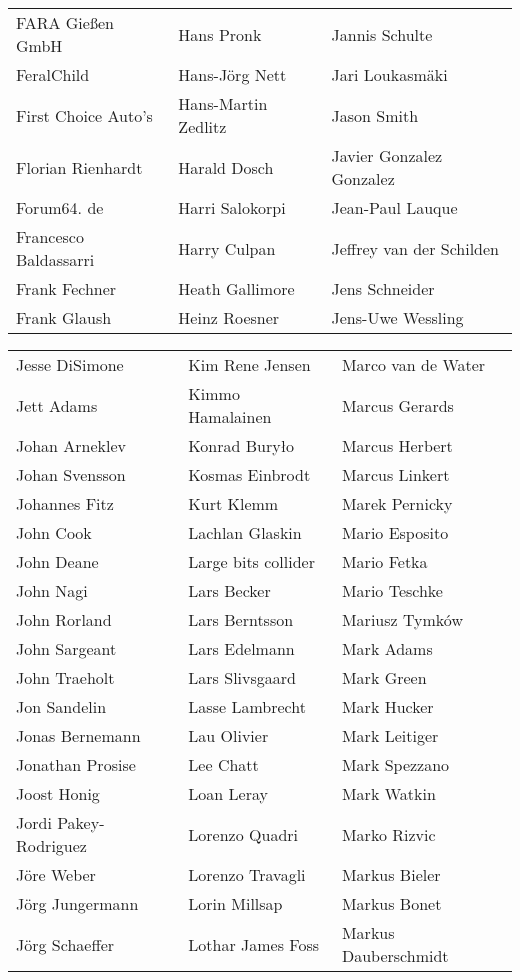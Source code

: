 \begin{small}
\begin{tabular}{p{4cm}p{4cm}p{4cm}}
FARA Gießen GmbH & Hans Pronk & Jannis Schulte \\
FeralChild & Hans-Jörg Nett & Jari Loukasmäki \\
First Choice Auto's & Hans-Martin Zedlitz & Jason Smith \\
Florian Rienhardt & Harald Dosch & Javier Gonzalez Gonzalez \\
Forum64. de & Harri Salokorpi & Jean-Paul Lauque \\
Francesco Baldassarri & Harry Culpan & Jeffrey van der Schilden \\
Frank Fechner & Heath Gallimore & Jens Schneider \\
Frank Glaush & Heinz Roesner & Jens-Uwe Wessling \\
\end{tabular}
\newpage
\setlength{\tabcolsep}{1mm}
\begin{tabular}{p{4cm}p{4cm}p{4cm}}
Jesse DiSimone & Kim Rene Jensen & Marco van de Water \\
Jett Adams & Kimmo Hamalainen & Marcus Gerards \\
Johan Arneklev & Konrad Buryło & Marcus Herbert \\
Johan Svensson & Kosmas Einbrodt & Marcus Linkert \\
Johannes Fitz & Kurt Klemm & Marek Pernicky \\
John Cook & Lachlan Glaskin & Mario Esposito \\
John Deane & Large bits collider & Mario Fetka \\
John Nagi & Lars Becker & Mario Teschke \\
John Rorland & Lars Berntsson & Mariusz Tymków \\
John Sargeant & Lars Edelmann & Mark Adams \\
John Traeholt & Lars Slivsgaard & Mark Green \\
Jon Sandelin & Lasse Lambrecht & Mark Hucker \\
Jonas Bernemann & Lau Olivier & Mark Leitiger \\
Jonathan Prosise & Lee Chatt & Mark Spezzano \\
Joost Honig & Loan Leray & Mark Watkin \\
Jordi Pakey-Rodriguez & Lorenzo Quadri & Marko Rizvic \\
Jöre Weber & Lorenzo Travagli & Markus Bieler \\
Jörg Jungermann & Lorin Millsap & Markus Bonet \\
Jörg Schaeffer & Lothar James Foss & Markus Dauberschmidt \\

\end{tabular}
\end{small}
